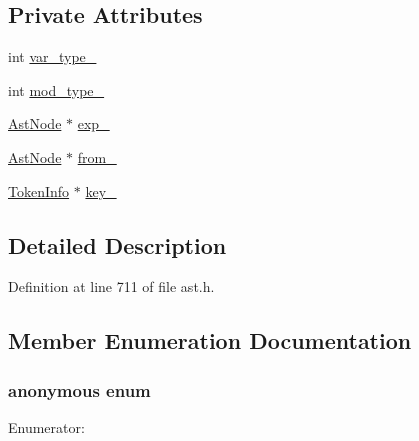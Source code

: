 \subsection*{Private Attributes}
\begin{DoxyCompactItemize}
\item 
int \hyperlink{classmocha_1_1_import_stmt_a2ea5a1ee98a22ed7636ea6731e99894f}{var\_\-type\_\-}
\item 
int \hyperlink{classmocha_1_1_import_stmt_a665f283f102a5f348394b3079319e090}{mod\_\-type\_\-}
\item 
\hyperlink{classmocha_1_1_ast_node}{AstNode} $\ast$ \hyperlink{classmocha_1_1_import_stmt_abed5a87fec9c603597972c2bc088ab7e}{exp\_\-}
\item 
\hyperlink{classmocha_1_1_ast_node}{AstNode} $\ast$ \hyperlink{classmocha_1_1_import_stmt_ae544907492adf27fd8b6f1e3580cfa77}{from\_\-}
\item 
\hyperlink{classmocha_1_1_token_info}{TokenInfo} $\ast$ \hyperlink{classmocha_1_1_import_stmt_a00ed77461561241ce01f4d71fc4631a4}{key\_\-}
\end{DoxyCompactItemize}


\subsection{Detailed Description}


Definition at line 711 of file ast.h.



\subsection{Member Enumeration Documentation}
\hypertarget{classmocha_1_1_import_stmt_a25bd09e7f01be8b2da5d6b6dbfb8d9b3}{
\subsubsection[{"@1}]{\setlength{\rightskip}{0pt plus 5cm}anonymous enum}}
\label{classmocha_1_1_import_stmt_a25bd09e7f01be8b2da5d6b6dbfb8d9b3}
\begin{Desc}
\item[Enumerator: ]\par
\begin{description}
\item[{\em 
\hypertarget{classmocha_1_1_import_stmt_a25bd09e7f01be8b2da5d6b6dbfb8d9b3a7d782d13f797a28105093148d4b65914}{
kFile}
\label{classmocha_1_1_import_stmt_a25bd09e7f01be8b2da5d6b6dbfb8d9b3a7d782d13f797a28105093148d4b65914}
}]\item[{\em 
\hypertarget{classmocha_1_1_import_stmt_a25bd09e7f01be8b2da5d6b6dbfb8d9b3a901d9f582740111c97dcfb1f521bd20a}{
kModule}
\label{classmocha_1_1_import_stmt_a25bd09e7f01be8b2da5d6b6dbfb8d9b3a901d9f582740111c97dcfb1f521bd20a}
}]\end{description}
\end{Desc}



